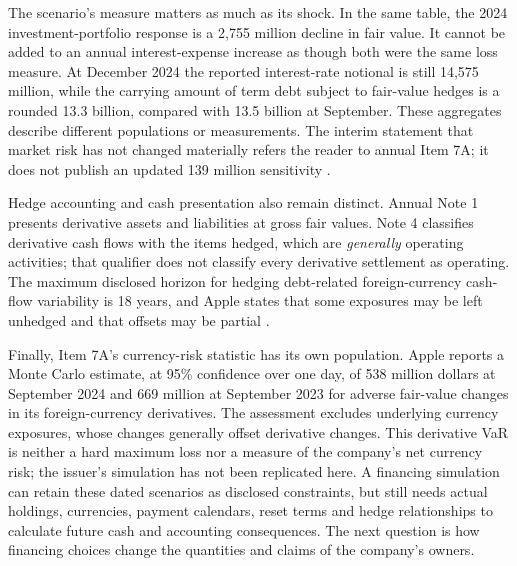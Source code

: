 The scenario's measure matters as much as its shock. In the same table, the
2024 investment-portfolio response is a 2,755 million decline in fair value.
It cannot be added to an annual interest-expense increase as though both were
the same loss measure. At December 2024 the reported interest-rate notional
is still 14,575 million, while the carrying amount of term debt subject to
fair-value hedges is a rounded 13.3 billion, compared with 13.5 billion at
September. These aggregates describe different populations or measurements.
The interim statement that market risk has not changed materially refers the
reader to annual Item 7A; it does not publish an updated 139 million sensitivity
\citep[Note 4 and Part I, Item 3]{apple2025q1}.

Hedge accounting and cash presentation also remain distinct. Annual Note 1
presents derivative assets and liabilities at gross fair values. Note 4
classifies derivative cash flows with the items hedged, which are
\emph{generally} operating activities; that qualifier does not classify every
derivative settlement as operating. The maximum disclosed horizon for hedging
debt-related foreign-currency cash-flow variability is 18 years, and Apple
states that some exposures may be left unhedged and that offsets may be partial
\citep[Notes 1 and 4, printed pp.~34 and 37--38]{apple2024}.

Finally, Item 7A's currency-risk statistic has its own population. Apple reports
a Monte Carlo estimate, at 95\% confidence over one day, of 538 million dollars
at September 2024 and 669 million at September 2023 for adverse fair-value
changes in its foreign-currency derivatives. The assessment excludes underlying
currency exposures, whose changes generally offset derivative changes. This
derivative VaR is neither a hard maximum loss nor a measure of the company's
net currency risk; the issuer's simulation has not been replicated here.
A financing simulation can retain these dated scenarios as disclosed
constraints, but still needs actual holdings, currencies, payment calendars,
reset terms and hedge relationships to calculate future cash and accounting
consequences. The next question is how financing choices change the quantities
and claims of the company's owners.
